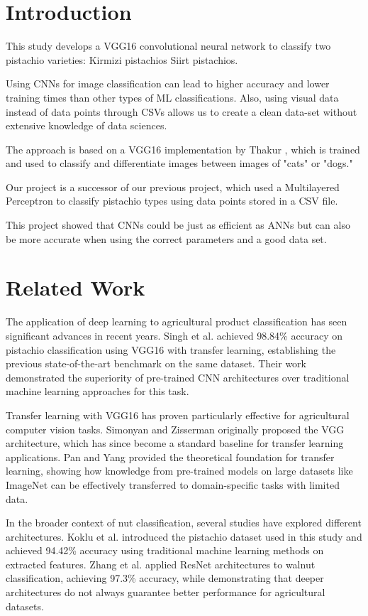 \documentclass[conference]{IEEEtran}
\begin{document}
\section{Introduction}
This study develops a VGG16 convolutional neural network to classify two pistachio varieties:
Kirmizi pistachios 
Siirt pistachios. 

Using CNNs for image classification can lead to higher accuracy and lower training times than other types of ML classifications. Also, using visual data instead of data points through CSVs allows us to create a clean data-set without extensive knowledge of data sciences.

The approach is based on a VGG16 implementation by Thakur \cite{b1}, which is trained and used to classify and differentiate images between images of "cats" or "dogs."

Our project is a successor of our previous project, which used a Multilayered Perceptron to classify pistachio types using data points stored in a CSV file.

This project showed that CNNs could be just as efficient as ANNs but can also be more accurate when using the correct parameters and a good data set.

\section{Related Work}

The application of deep learning to agricultural product classification has seen significant advances in recent years. Singh et al. \cite{b7} achieved 98.84\% accuracy on pistachio classification using VGG16 with transfer learning, establishing the previous state-of-the-art benchmark on the same dataset. Their work demonstrated the superiority of pre-trained CNN architectures over traditional machine learning approaches for this task.

Transfer learning with VGG16 has proven particularly effective for agricultural computer vision tasks. Simonyan and Zisserman \cite{b6} originally proposed the VGG architecture, which has since become a standard baseline for transfer learning applications. Pan and Yang \cite{b4} provided the theoretical foundation for transfer learning, showing how knowledge from pre-trained models on large datasets like ImageNet can be effectively transferred to domain-specific tasks with limited data.

In the broader context of nut classification, several studies have explored different architectures. Koklu et al. \cite{b3} introduced the pistachio dataset used in this study and achieved 94.42\% accuracy using traditional machine learning methods on extracted features. Zhang et al. \cite{b9} applied ResNet architectures to walnut classification, achieving 97.3\% accuracy, while demonstrating that deeper architectures do not always guarantee better performance for agricultural datasets.
\end{document}
